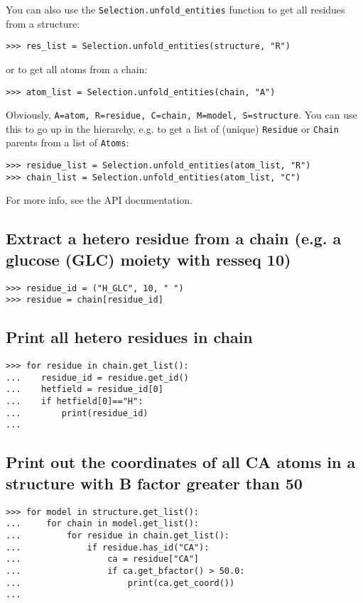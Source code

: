 You can also use the \verb+Selection.unfold_entities+ function to get all residues from a structure:
\begin{verbatim}
>>> res_list = Selection.unfold_entities(structure, "R")
\end{verbatim}
or to get all atoms from a chain:
\begin{verbatim}
>>> atom_list = Selection.unfold_entities(chain, "A")
\end{verbatim}
Obviously, \verb+A=atom, R=residue, C=chain, M=model, S=structure+.
You can use this to go up in the hierarchy, e.g. to get a list of
(unique) \verb+Residue+ or \verb+Chain+ parents from a list of
\verb+Atoms+:

\begin{verbatim}
>>> residue_list = Selection.unfold_entities(atom_list, "R")
>>> chain_list = Selection.unfold_entities(atom_list, "C")
\end{verbatim}
For more info, see the API documentation.

\subsection*{Extract a hetero residue from a chain (e.g. a glucose (GLC) moiety with resseq 10)}

\begin{verbatim}
>>> residue_id = ("H_GLC", 10, " ")
>>> residue = chain[residue_id]
\end{verbatim}

\subsection*{Print all hetero residues in chain}

\begin{verbatim}
>>> for residue in chain.get_list():
...    residue_id = residue.get_id()
...    hetfield = residue_id[0]
...    if hetfield[0]=="H":
...        print(residue_id)
...
\end{verbatim}

\subsection*{Print out the coordinates of all CA atoms in a structure with B factor greater than 50}

\begin{verbatim}
>>> for model in structure.get_list():
...     for chain in model.get_list():
...         for residue in chain.get_list():
...             if residue.has_id("CA"):
...                 ca = residue["CA"]
...                 if ca.get_bfactor() > 50.0:
...                     print(ca.get_coord())
...
\end{verbatim}

